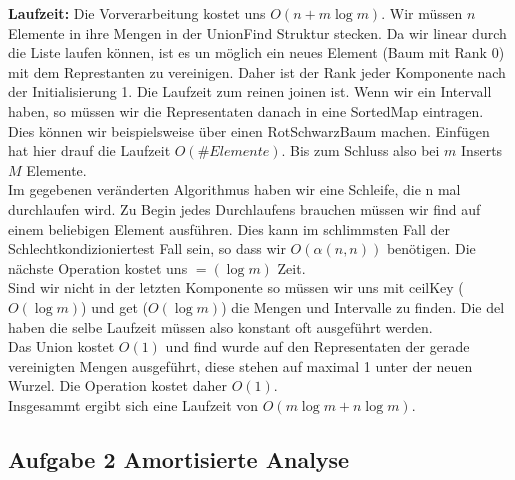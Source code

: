 \documentclass[11pt,a4paper,ngerman]{article}
\begin{document}
\begin{enumerate}[\bfseries a)]
\textbf{Laufzeit:}
Die Vorverarbeitung kostet uns $O(n + m \log m)$. Wir müssen $n$ Elemente in ihre Mengen in der UnionFind Struktur stecken. Da wir linear durch die Liste laufen können, ist es un möglich ein neues Element (Baum mit Rank 0) mit dem Represtanten zu vereinigen. Daher ist der Rank jeder Komponente nach der Initialisierung 1. Die Laufzeit zum reinen joinen ist. Wenn wir ein Intervall haben, so müssen wir die Representaten danach in eine SortedMap eintragen. Dies können wir beispielsweise über einen RotSchwarzBaum machen. Einfügen hat hier drauf die Laufzeit $O(\#Elemente)$. Bis zum Schluss also bei $m$ Inserts $M$ Elemente.\\

Im gegebenen veränderten Algorithmus haben wir eine Schleife, die n mal durchlaufen wird. Zu Begin jedes Durchlaufens brauchen müssen wir find auf einem beliebigen Element ausführen. Dies kann im schlimmsten Fall der Schlechtkondizioniertest Fall sein, so dass wir $O(\alpha (n,n))$ benötigen. Die nächste Operation kostet uns $=(\log m)$ Zeit.\\

Sind wir nicht in der letzten Komponente so müssen wir uns mit ceilKey ($O ( \log m) $) und get  ($O(\log m)$) die Mengen und Intervalle zu finden. Die del haben die selbe Laufzeit müssen also konstant oft ausgeführt werden.\\

Das Union kostet $O (1)$ und find wurde auf den Representaten der gerade vereinigten Mengen ausgeführt, diese stehen auf maximal 1 unter der neuen Wurzel. Die Operation kostet daher $O(1)$.\\

Insgesammt ergibt sich eine Laufzeit von $O (m \log m + n \log m)$.

\end{enumerate}

\subsection*{Aufgabe 2 \mdseries Amortisierte Analyse}
\end{document}
